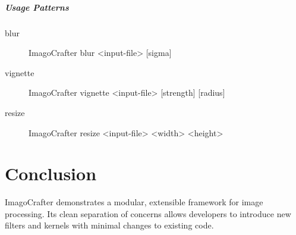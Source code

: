 \documentclass[12pt,a4paper]{report}
\begin{document}
\paragraph{Usage Patterns}
\begin{description}
  \item[blur]  ImagoCrafter blur <input-file> [sigma]
  \item[vignette]  ImagoCrafter vignette <input-file> [strength] [radius]
  \item[resize]  ImagoCrafter resize <input-file> <width> <height>
\end{description}

\chapter{Conclusion}
ImagoCrafter demonstrates a modular, extensible framework for image processing. Its clean separation of concerns allows developers to introduce new filters and kernels with minimal changes to existing code.
\end{document}
